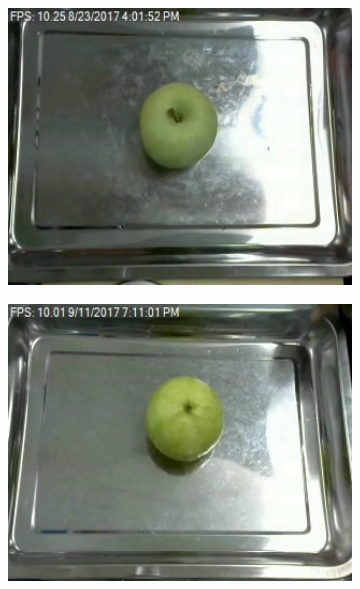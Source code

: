 \documentclass[a4,german]{article}
\begin{document}
\begin{figure}[b] %
\begin{subfigure}[c]{0.19\textwidth}
\includegraphics[width=1\textwidth]{Apple_Green_60.png} 
\subcaption{}
\end{subfigure}
\begin{subfigure}[c]{0.19\textwidth}
\includegraphics[width=1\textwidth]{Guava_21.png}
\subcaption{}
\end{subfigure}
\begin{subfigure}[c]{0.19\textwidth}

\end{subfigure}
\end{figure}
\end{document}

